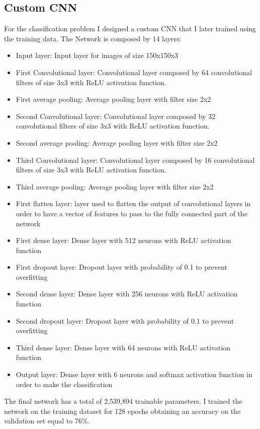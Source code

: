 \documentclass[12pt,journal,compsoc]{IEEEtran}
\begin{document}
\subsection{Custom CNN}
For the classification problem I designed a custom CNN that I later trained using the training data. The Network is composed by 14 layers:
\begin{itemize}
	\item Input layer: Input layer for images of size 150x150x3
	\item First Convolutional layer: Convolutional layer composed by 64 convolutional filters of size 3x3 with ReLU activation function.
	\item First average pooling: Average pooling layer with filter size 2x2
	\item Second Convolutional layer: Convolutional layer composed by 32 convolutional filters of size 3x3 with ReLU activation function.
	\item Second average pooling: Average pooling layer with filter size 2x2
	\item Third Convolutional layer: Convolutional layer composed by 16 convolutional filters of size 3x3 with ReLU activation function.
	\item Third average pooling: Average pooling layer with filter size 2x2
	\item First flatten layer: layer used to flatten the output of convolutional layers in order to have a vector of features to pass to the fully connected part of the network
	\item First dense layer: Dense layer with 512 neurons with ReLU activation function
	\item First dropout layer: Dropout layer with probability of 0.1 to prevent overfitting
	\item Second dense layer: Dense layer with 256 neurons with ReLU activation function
	\item Second dropout layer: Dropout layer with probability of 0.1 to prevent overfitting
	\item Third dense layer: Dense layer with 64 neurons with ReLU activation function
	\item Output layer: Dense layer with 6 neurons and softmax activation function in order to make the classification
\end{itemize}
The final network has a total of 2,539,894 trainable parameters.
I trained the network on the training dataset for 128 epochs obtaining an accuracy on the validation set equal to 76\%.
\end{document}

